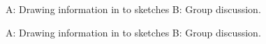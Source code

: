 \begin{figure}[!htb]
    \centering
    \hfill
    \caption{A: Drawing information in to sketches B: Group discussion. }%
    \label{fig:observation_env}%
\end{figure}



\begin{figure}[!htb]
    \centering
    \hfill
    \caption{A: Drawing information in to sketches B: Group discussion. }%
    \label{fig:observation_env}%
\end{figure}





